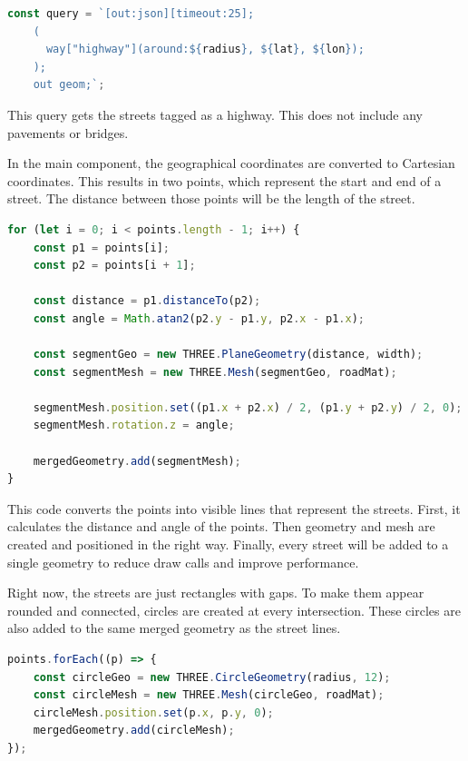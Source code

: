 \begin{lstlisting}[language=JavaScript,caption=Overpass Query for the streets]
const query = `[out:json][timeout:25];
    (
      way["highway"](around:${radius}, ${lat}, ${lon});
    );
    out geom;`;
\end{lstlisting}

This query gets the streets tagged as a highway. This does not include any pavements or bridges.

In the main component, the geographical coordinates are converted to Cartesian coordinates. This results in two points, which represent the start and end of a street. The distance between those points will be the length of the street. 

\begin{lstlisting}[language=JavaScript,caption=Add streets]
for (let i = 0; i < points.length - 1; i++) {
    const p1 = points[i];
    const p2 = points[i + 1];

    const distance = p1.distanceTo(p2);
    const angle = Math.atan2(p2.y - p1.y, p2.x - p1.x);

    const segmentGeo = new THREE.PlaneGeometry(distance, width);
    const segmentMesh = new THREE.Mesh(segmentGeo, roadMat);

    segmentMesh.position.set((p1.x + p2.x) / 2, (p1.y + p2.y) / 2, 0);
    segmentMesh.rotation.z = angle;

    mergedGeometry.add(segmentMesh);
}
\end{lstlisting}

This code converts the points into visible lines that represent the streets. First, it calculates the distance and angle of the points. Then geometry and mesh are created and positioned in the right way. Finally, every street will be added to a single geometry to reduce draw calls and improve performance.

Right now, the streets are just rectangles with gaps. To make them appear rounded and connected, circles are created at every intersection. These circles are also added to the same merged geometry as the street lines.

\begin{lstlisting}[language=JavaScript,caption=Add circles to intersections]
points.forEach((p) => {
    const circleGeo = new THREE.CircleGeometry(radius, 12);
    const circleMesh = new THREE.Mesh(circleGeo, roadMat);
    circleMesh.position.set(p.x, p.y, 0);
    mergedGeometry.add(circleMesh);
});
\end{lstlisting}


